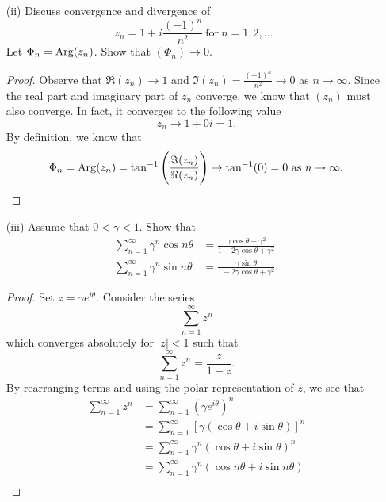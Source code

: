 \documentclass[a4paper]{article}
\begin{document}
\begin{enumerate}
\begin{proof}
    \end{proof}
    \item[(ii)] Discuss convergence and divergence of 
        \[  {z}_{n} = 1 + i \frac{ (-1)^{n} }{ n^{2} } \ \text{for} \ n = 1,2,\dots \ . \]
        Let \( \Phi_n = \operatorname{Arg}({z}_{n}) \). Show that \( ({\Phi}_{n}) \to 0 \).
        \begin{proof}
        Observe that \( \Re({z}_{n}) \to 1  \) and \( \Im({z}_{n}) = \frac{ (-1)^{n} }{ n^{2} } \to 0 \) as \( n \to \infty  \). Since the real part and imaginary part of \( {z}_{n} \) converge, we know that \( ({z}_{n}) \) must also converge. In fact, it converges to the following value
        \[  {z}_{n} \to 1 + 0i = 1. \]
        By definition, we know that 
        \[  {\Phi}_{n} = \operatorname{Arg}({z}_{n}) = \tan^{-1} \Bigg(  \frac{ \Im({z}_{n}) }{ \Re({z}_{n})  }  \Bigg) \to \tan^{-1}( 0 ) = 0 \ \text{as} \ n \to \infty. \]
        \end{proof}
    \item[(iii)] Assume that \( 0 < \gamma < 1  \). Show that 
        \begin{align*}
            \sum_{ n=1  }^{ \infty  } \gamma^{n} \cos n \theta &= \frac{ \gamma \cos \theta - \gamma^{2} }{ 1 - 2 \gamma \cos \theta + \gamma^{2} } \\
            \sum_{ n=1  }^{ \infty  } \gamma^{n} \sin n \theta &= \frac{  \gamma \sin \theta   }{  1 - 2 \gamma \cos \theta + \gamma^{2} }. 
    \end{align*}
        \begin{proof}
        Set \( z = \gamma e^{i\theta} \). Consider the series  
        \[  \sum_{ n=1  }^{ \infty  } z^{n} \]
        which converges absolutely for \( | z  | < 1  \) such that 
        \[  \sum_{ n=1  }^{ \infty  } z^{n} = \frac{ z  }{  1 - z  }. \tag{1} \]
        By rearranging terms and using the polar representation of \( z \), we see that
        \begin{align*}
            \sum_{ n=1  }^{ \infty  } z^{n} &= \sum_{ n=1  }^{ \infty  } (\gamma e^{i\theta})^{n} \\
                                            &= \sum_{ n=1  }^{ \infty  } [\gamma (\cos \theta + i \sin \theta)]^{n} \\ 
                                            &= \sum_{ n=1  }^{ \infty  } \gamma^{n} (\cos \theta + i \sin \theta )^{n} \\
                                            &= \sum_{ n=1  }^{ \infty  } \gamma^{n} (\cos n \theta + i \sin n \theta ) \tag{De Moivre's Theorem} \\

\end{align*}
\end{proof}
\end{enumerate}
\end{document}
